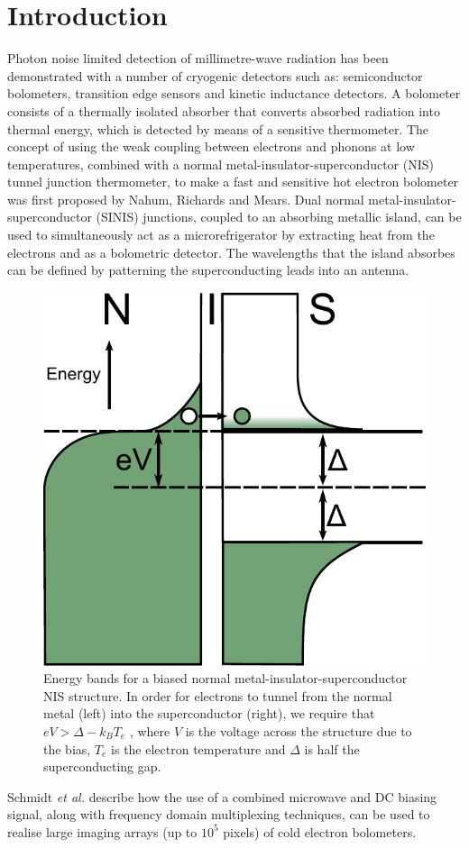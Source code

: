 \documentclass[aip, apl, a4paper, amsmath,amssymb, reprint]{revtex4-1}
\begin{document}
\section{Introduction} \label{sec:Introduction}
Photon noise limited detection of millimetre-wave radiation has been demonstrated with a number of cryogenic detectors such as: semiconductor bolometers, transition edge sensors and kinetic inductance detectors\cite{Morozov11,Doyle08}. A bolometer consists of a thermally isolated absorber that converts absorbed radiation into thermal energy, which is detected by means of a sensitive thermometer. The concept of using the weak coupling between electrons and phonons at low temperatures, combined with a normal metal-insulator-superconductor (NIS) tunnel junction thermometer, to make a fast and sensitive hot electron bolometer was first proposed by Nahum, Richards and Mears\cite{Nahum93, Nahum94}. Dual normal metal-insulator-superconductor (SINIS) junctions, coupled to an absorbing metallic island, can be used to simultaneously act as a microrefrigerator by extracting heat from the electrons and as a bolometric detector. The wavelengths that the island absorbes can be defined by patterning the superconducting leads into an antenna.
\begin{figure}[ht]
\includegraphics[width = 0.5\columnwidth]{NIS_energyLevels_Bias}
\caption{Energy bands for a biased normal metal-insulator-superconductor NIS structure. In order for electrons to tunnel from the normal metal (left) into the superconductor (right), we require that  $eV > \Delta - k_{B}T_{e}$ , where $V$  is the voltage across the structure due to the bias, $T_{e}$ is the electron temperature and $\Delta $ is half the superconducting gap.}
\label{fig:NISenergy}
\end{figure}

Schmidt \textit{et al.}\cite{Schmidt2005} describe how the use of a combined microwave and DC biasing signal, along with frequency domain multiplexing techniques, can be used to realise large imaging arrays (up to $10^{5}$ pixels) of cold electron bolometers.
\end{document}
